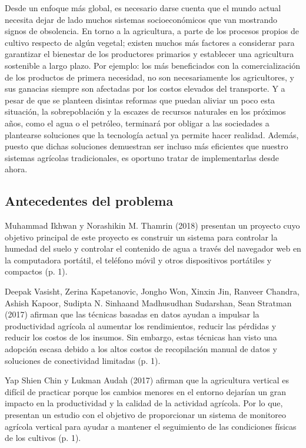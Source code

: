 \documentclass{report}
\begin{document}
Desde un enfoque más global, es necesario darse cuenta que el mundo actual
necesita dejar de lado muchos sistemas socioeconómicos que van mostrando signos
de obsolencia. En torno a la agricultura, a parte de los procesos propios de
cultivo respecto de algún vegetal; existen muchos más factores a considerar para
garantizar el bienestar de los productores primarios y establecer una
agricultura sostenible a largo plazo. Por ejemplo: los más beneficiados con la
comercialización de los productos de primera necesidad, no son necesariamente
los agricultores, y sus ganacias siempre son afectadas por los costos elevados
del transporte. Y a pesar de que se planteen disintas reformas que puedan
aliviar un poco esta situación, la sobrepoblación y la escazes de recursos
naturales en los próximos años, como el agua o el petróleo, terminará por obligar
a las sociedades a plantearse soluciones que la tecnología actual ya permite
hacer realidad. Además, puesto que dichas soluciones demuestran ser incluso más
eficientes que nuestro sistemas agrícolas tradicionales, es oportuno tratar de
implementarlas desde ahora.
\subsection{Antecedentes del problema}
Muhammad Ikhwan y Norashikin M. Thamrin (2018) presentan un proyecto cuyo
objetivo principal de este proyecto es construir un sistema para controlar la
humedad del suelo y controlar el contenido de agua a través del navegador web en
la computadora portátil, el teléfono móvil y otros dispositivos portátiles y
compactos (p. 1).

Deepak Vasisht, Zerina Kapetanovic, Jongho Won, Xinxin Jin, Ranveer Chandra,
Ashish Kapoor, Sudipta N. Sinhaand Madhusudhan Sudarshan, Sean Stratman (2017)
afirman que las técnicas basadas en datos ayudan a impulsar la productividad
agrícola al aumentar los rendimientos, reducir las pérdidas y reducir los costos
de los insumos. Sin embargo, estas técnicas han visto una adopción escasa debido
a los altos costos de recopilación manual de datos y soluciones de conectividad
limitadas (p. 1).

Yap Shien Chin y Lukman Audah (2017) afirman que la agricultura vertical es
difícil de practicar porque los cambios menores en el entorno dejarían un gran
impacto en la productividad y la calidad de la actividad agrícola. Por lo que,
presentan un estudio con el objetivo de proporcionar un sistema de monitoreo
agrícola vertical para ayudar a mantener el seguimiento de las condiciones
físicas de los cultivos (p. 1).
\end{document}
